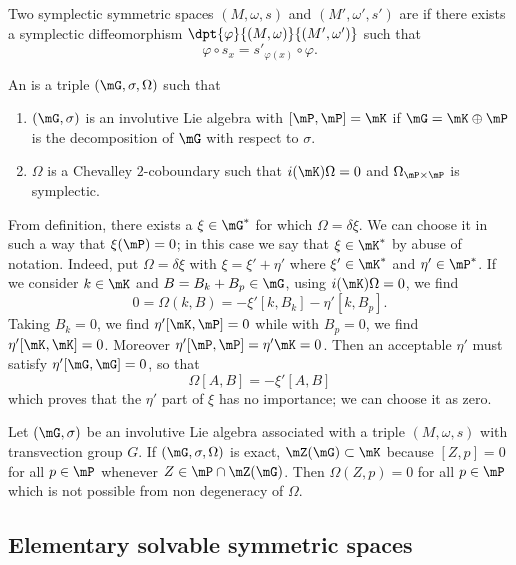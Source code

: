 \begin{definition}
Two symplectic symmetric spaces $(M,\omega,s)$ and $(M',\omega',s')$  are  if there exists a symplectic diffeomorphism $\dpt{\varphi}{(M,\omega)}{(M',\omega')}$ such that
\begin{equation}
  \varphi\circ s_x=s'_{\varphi(x)}\circ\varphi.
\end{equation}

\end{definition}


\begin{definition}
An  is a triple $(\mG,\sigma,\Omega)$ such that

\begin{enumerate}
\item $(\mG,\sigma)$ is an involutive Lie algebra with $[\mP,\mP]=\mK$ if $\mG=\mK\oplus\mP$ is the decomposition of $\mG$ with respect to $\sigma$.

\item $\Omega$ is a Chevalley $2$-coboundary such that $i(\mK)\Omega=0$ and $\Omega_{\mP\times\mP}$ is symplectic.

\end{enumerate}

\end{definition}

From definition, there exists a $\xi\in\mG^*$ for which $\Omega=\delta\xi$. We can choose it in such a way that $\xi(\mP)=0$; in this case we say that $\xi\in\mK^*$ by abuse of notation. Indeed, put $\Omega=\delta\xi$ with $\xi=\xi'+\eta'$ where $\xi'\in\mK^*$ and $\eta'\in\mP^*$. If we consider $k\in\mK$ and $B=B_k+B_p\in\mG$, using $i(\mK)\Omega=0$, we find
\[
  0=\Omega(k,B)=-\xi'[k,B_k]-\eta'[k,B_p].
\]
Taking $B_k=0$, we find $\eta'[\mK,\mP]=0$ while with $B_p=0$, we find $\eta'[\mK,\mK]=0$. Moreover $\eta'[\mP,\mP]=\eta'\mK=0$. Then an acceptable $\eta'$ must satisfy $\eta'[\mG,\mG]=0$, so that
\[
  \Omega[A,B]=-\xi'[A,B]
\]
which proves that the $\eta'$ part of $\xi$ has no importance; we can choose it as zero.


Let $(\mG,\sigma)$ be an involutive Lie algebra associated with a triple $(M,\omega,s)$ with transvection group $G$. If $(\mG,\sigma,\Omega)$ is exact, $\mZ(\mG)\subset \mK$ because $[Z,p]=0$ for all $p\in\mP$ whenever $Z\in\mP\cap\mZ(\mG)$. Then $\Omega(Z,p)=0$ for all $p\in \mP$ which is not possible from non degeneracy of $\Omega$.

\subsection{Elementary solvable symmetric spaces}

